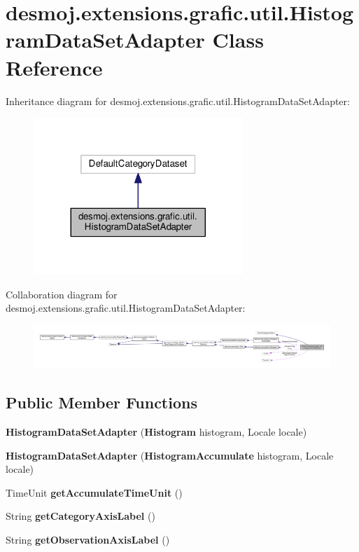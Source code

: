\section{desmoj.\-extensions.\-grafic.\-util.\-Histogram\-Data\-Set\-Adapter Class Reference}
\label{classdesmoj_1_1extensions_1_1grafic_1_1util_1_1_histogram_data_set_adapter}


Inheritance diagram for desmoj.\-extensions.\-grafic.\-util.\-Histogram\-Data\-Set\-Adapter\-:
\nopagebreak
\begin{figure}[H]
\begin{center}
\leavevmode
\includegraphics[width=224pt]{classdesmoj_1_1extensions_1_1grafic_1_1util_1_1_histogram_data_set_adapter__inherit__graph}
\end{center}
\end{figure}


Collaboration diagram for desmoj.\-extensions.\-grafic.\-util.\-Histogram\-Data\-Set\-Adapter\-:
\nopagebreak
\begin{figure}[H]
\begin{center}
\leavevmode
\includegraphics[width=350pt]{classdesmoj_1_1extensions_1_1grafic_1_1util_1_1_histogram_data_set_adapter__coll__graph}
\end{center}
\end{figure}
\subsection*{Public Member Functions}
\begin{DoxyCompactItemize}
\item 
{\bf Histogram\-Data\-Set\-Adapter} ({\bf Histogram} histogram, Locale locale)
\item 
{\bf Histogram\-Data\-Set\-Adapter} ({\bf Histogram\-Accumulate} histogram, Locale locale)
\item 
Time\-Unit {\bf get\-Accumulate\-Time\-Unit} ()
\item 
String {\bf get\-Category\-Axis\-Label} ()
\item 
String {\bf get\-Observation\-Axis\-Label} ()
\end{DoxyCompactItemize}


